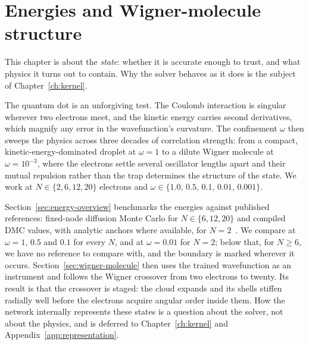 \graphicspath{{../results/figures/results/}{../results/figures/}}


\begingroup
\let\clearpage\relax
\let\cleardoublepage\relax
\chapter[Energies and Wigner-molecule structure]{Energies and Wigner-molecule structure}
\label{ch:results}
\endgroup

This chapter is about the \emph{state}: whether it is accurate enough to trust, and what
physics it turns out to contain. Why the solver behaves as it does is the subject of
Chapter~\ref{ch:kernel}.

The quantum dot is an unforgiving test. The Coulomb interaction is singular wherever two
electrons meet, and the kinetic energy carries second derivatives, which magnify any error
in the wavefunction's curvature. The confinement $\omega$ then sweeps the physics across
three decades of correlation strength: from a compact, kinetic-energy-dominated droplet at
$\omega=1$ to a dilute Wigner molecule at $\omega=10^{-3}$, where the electrons settle
several oscillator lengths apart and their mutual repulsion rather than the trap determines
the structure of the state. We work at $N\in\{2,6,12,20\}$ electrons and
$\omega\in\{1.0,\,0.5,\,0.1,\,0.01,\,0.001\}$.

Section~\ref{sec:energy-overview} benchmarks the energies against published references:
fixed-node diffusion Monte Carlo for $N\in\{6,12,20\}$
\cite{Hogberget2013-DMC,Nordhagen2023-NeuralNetworksFermions} and compiled DMC values, with
analytic anchors where available, for $N{=}2$~\cite{Taut1994-TwoElectrons,Hogberget2013-DMC}. We
compare at $\omega=1$, $0.5$ and $0.1$ for every $N$, and at $\omega=0.01$ for $N{=}2$; below
that, for $N\ge6$, we have no reference to compare with, and the boundary is marked wherever
it occurs. Section~\ref{sec:wigner-molecule} then uses the trained wavefunction as an instrument and
follows the Wigner crossover from two electrons to twenty. Its result is that the crossover
is staged: the cloud expands and its shells stiffen radially well before the electrons
acquire angular order inside them. How the network internally represents these states is a question about the solver, not about the physics, and is deferred to
Chapter~\ref{ch:kernel} and Appendix~\ref{app:representation}.

